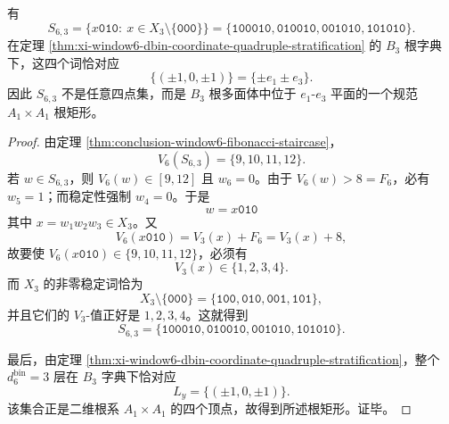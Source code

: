\begin{proposition}\label{prop:conclusion-window6-middle-step-a1xa1-rectangle}
有
\[
S_{6,3}
=
\{x\mathtt{010}:\ x\in X_3\setminus\{\mathtt{000}\}\}
=
\{\mathtt{100010},\mathtt{010010},\mathtt{001010},\mathtt{101010}\}.
\]
在定理 \ref{thm:xi-window6-dbin-coordinate-quadruple-stratification} 的 \(B_3\) 根字典下，这四个词恰对应
\[
\{(\pm 1,0,\pm 1)\}
=
\{\pm e_1\pm e_3\}.
\]
因此 \(S_{6,3}\) 不是任意四点集，而是 \(B_3\) 根多面体中位于 \(e_1\)-\(e_3\) 平面的一个规范 \(A_1\times A_1\) 根矩形。
\end{proposition}
\begin{proof}
由定理 \ref{thm:conclusion-window6-fibonacci-staircase}，
\[
V_6(S_{6,3})=\{9,10,11,12\}.
\]
若 \(w\in S_{6,3}\)，则 \(V_6(w)\in[9,12]\) 且 \(w_6=0\)。由于 \(V_6(w)>8=F_6\)，必有 \(w_5=1\)；而稳定性强制 \(w_4=0\)。于是
\[
w=x\mathtt{010}
\]
其中 \(x=w_1w_2w_3\in X_3\)。又
\[
V_6(x\mathtt{010})=V_3(x)+F_6=V_3(x)+8,
\]
故要使 \(V_6(x\mathtt{010})\in\{9,10,11,12\}\)，必须有
\[
V_3(x)\in\{1,2,3,4\}.
\]
而 \(X_3\) 的非零稳定词恰为
\[
X_3\setminus\{\mathtt{000}\}
=
\{\mathtt{100},\mathtt{010},\mathtt{001},\mathtt{101}\},
\]
并且它们的 \(V_3\)-值正好是 \(1,2,3,4\)。这就得到
\[
S_{6,3}
=
\{\mathtt{100010},\mathtt{010010},\mathtt{001010},\mathtt{101010}\}.
\]

最后，由定理 \ref{thm:xi-window6-dbin-coordinate-quadruple-stratification}，整个 \(d_6^{\mathrm{bin}}=3\) 层在 \(B_3\) 字典下恰对应
\[
L_y=\{(\pm1,0,\pm1)\}.
\]
该集合正是二维根系 \(A_1\times A_1\) 的四个顶点，故得到所述根矩形。证毕。
\end{proof}

